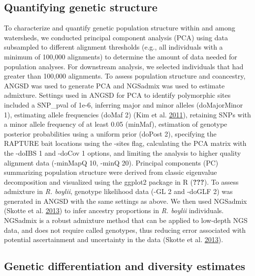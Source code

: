\documentclass[proquest,12pt,final]{ucthesis-CA2012} %
\begin{document}
\begin{ucmainmatter}
\hypertarget{quantifying-genetic-structure}{%
\subsection{Quantifying genetic
structure}\label{quantifying-genetic-structure}}

To characterize and quantify genetic population structure within and
among watersheds, we conducted principal component analysis (PCA) using
data subsampled to different alignment thresholds (e.g., all individuals
with a minimum of 100,000 alignments) to determine the amount of data
needed for population analyses. For downstream analysis, we selected
individuals that had greater than 100,000 alignments. To assess
population structure and coancestry, ANGSD was used to generate PCA and
NGSadmix was used to estimate admixture. Settings used in ANGSD for PCA
to identify polymorphic sites included a SNP\_pval of 1e-6, inferring
major and minor alleles (doMajorMinor 1), estimating allele frequencies
(doMaf 2) (Kim et al.
\protect\hyperlink{ref-kim_estimation_2011}{2011}), retaining SNPs with
a minor allele frequency of at least 0.05 (minMaf), estimation of
genotype posterior probabilities using a uniform prior (doPost 2),
specifying the RAPTURE bait locations using the -sites flag, calculating
the PCA matrix with the -doIBS 1 and -doCov 1 options, and limiting the
analysis to higher quality alignment data (-minMapQ 10, -minQ 20).
Principal components (PC) summarizing population structure were derived
from classic eigenvalue decomposition and visualized using the ggplot2
package in R ({\textbf{???}}). To assess admixture in \emph{R. boylii},
genotype likelihood data (-GL 2 and -doGLF 2) was generated in ANGSD
with the same settings as above. We then used NGSadmix (Skotte et al.
\protect\hyperlink{ref-skotte_estimating_2013}{2013}) to infer ancestry
proportions in \emph{R. boylii} individuals. NGSadmix is a robust
admixture method that can be applied to low-depth NGS data, and does not
require called genotypes, thus reducing error associated with potential
ascertainment and uncertainty in the data (Skotte et al.
\protect\hyperlink{ref-skotte_estimating_2013}{2013}).

\hypertarget{genetic-differentiation-and-diversity-estimates-1}{%
\subsection{Genetic differentiation and diversity
estimates}\label{genetic-differentiation-and-diversity-estimates-1}}


\end{ucmainmatter}
\end{document}
